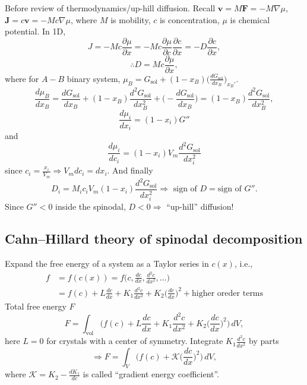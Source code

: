 \documentclass[12pt]{article}
\begin{document}
Before review of thermodynamics/up-hill diffusion.
Recall $\bm{v} = M \bm{F} = - M \nabla \mu$, $\bm{J} = c \bm{v} = - M c \nabla \mu$, where
$M$ is mobility, $c$ is concentration, $\mu$ is chemical potential.
In 1D,
\begin{equation*}
	J = - M c \frac{ \partial \mu }{ \partial x } = - M c \frac{ \partial \mu }{ \partial c } \frac{ \partial c }{ \partial x } = - D \frac{ \partial c }{ \partial x },
\end{equation*}
\begin{equation*}
	\therefore D = M c \frac{ \partial \mu }{ \partial x },
\end{equation*}
where for $A-B$ binary system, $\mu_B = G_{\text{sol}} + (1-x_B)
	\Big( \frac{ dG_{\text{sol}} }{ dx_B } \Big)_{x_B'}$.
\begin{equation*}
	\frac{ d\mu_B }{ dx_B } = \frac{ dG_{\text{sol}} }{ dx_B } + (1-x_B)
	\frac{ d^2G_{\text{sol}} }{ dx_B^2 } +
	\Big( - \frac{ dG_{\text{sol}} }{ dx_B } \Big) =
	(1-x_B)
	\frac{ d^2G_{\text{sol}} }{ dx_B^2 },
\end{equation*}
\begin{equation*}
	\frac{ d\mu_i }{ dx_i } = (1-x_i) G''
\end{equation*}
and
\begin{equation*}
	\frac{ d\mu_i }{ dc_i } = (1-x_i) V_m \frac{ d^2G_{\text{sol}} }{ dx_i^2 }
\end{equation*}
since $c_i = \frac{ x_i }{ V_m } \Rightarrow V_m dc_i = dx_i$.
And finally
\begin{equation*}
	D_i = M_i c_i V_m (1-x_i) \frac{ d^2G_{\text{sol}} }{ dx_i^2 } \Rightarrow
	{\text{ sign of }} D = {\text{sign of }} G''.
\end{equation*}
Since $G'' < 0$ inside the spinodal, $D < 0 \Rightarrow $ ``up-hill'' diffusion!

\subsection{Cahn--Hillard theory of spinodal decomposition}
Expand the free energy of a system as a Taylor series in $c(x)$,
i.e.,
\begin{align*}
	f & = f(c(x)) = f\Big( c, \frac{ dc }{ dx }, \frac{ d^2 c }{ dx^2 }, \ldots \Big) \\
	  & = f(c) + L \frac{ dc }{ dx } + K_1 \frac{ d^2 c }{ dx^2 } + K_2 \Big(
	\frac{ dc }{ dx } \Big)^2 + {\text{higher oreder terms}}
\end{align*}
Total free energy $F$
\begin{equation*}
	F = \int_{\text{vol}} \bigg(
	f(c) + L \frac{ dc }{ dx } + K_1 \frac{ d^2 c }{ dx^2 } + K_2 \Big(
	\frac{ dc }{ dx } \Big)^2 \bigg) \, dV,
\end{equation*}
here $L = 0$ for crystals with a center of symmetry.
Integrate $K_1 \frac{ d^2 c }{ dx^2 }$ by parts
\begin{equation*}
	\Rightarrow F = \int_V \bigg(
	f(c) + \mathcal{K} \Big( \frac{ dc }{ dx } \Big)^2
	\bigg) \, dV,
\end{equation*}
where $\mathcal{K} = K_2 - \frac{ dK_1 }{ dc }$ is called ``gradient energy
coefficient''.
\end{document}
